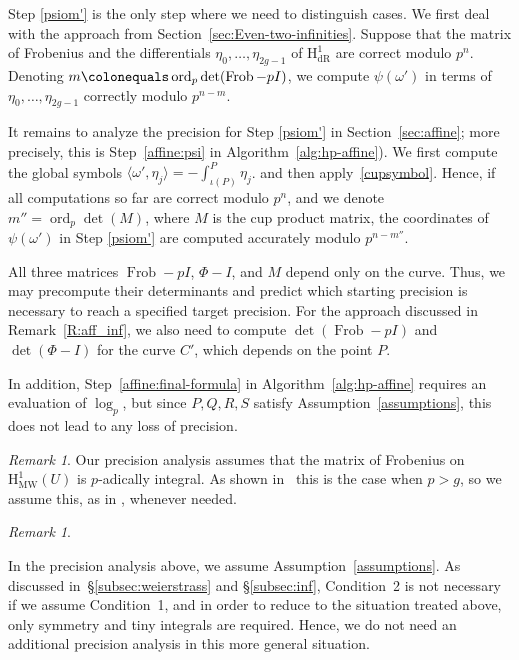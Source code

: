 \documentclass[11pt, a4paper]{amsart}
\newcommand{\hdr}{\operatorname{H^1_{dR}}}
\newcommand{\hmw}{\operatorname{H^1_{MW}}}
\newcommand{\ord}{\operatorname{ord}}
\newcommand{\Frob}{\operatorname{Frob}}
\theoremstyle{remark}
\newtheorem{remark}[theorem]{Remark}
\numberwithin{equation}{section}
\newcommand{\sg}{{}}
\begin{document}
{Step \eqref{psiom'} is the only step where we need to distinguish cases. We first deal with the approach from \sg{Section~\ref{sec:Even-two-infinities}}. Suppose that the matrix of Frobenius and the differentials $\eta_0,\ldots,\eta_{2g-1}$ of
$\hdr$ are correct modulo $p^n$. Denoting  $m\colonequals \ord_p\det(\Frob-pI)$, we compute $\psi(\omega')$ in terms of $\eta_0,\ldots,\eta_{2g-1}$ correctly modulo $p^{n-m}$.

It remains to analyze the precision for Step \eqref{psiom'} in \sg{Section~\ref{sec:affine}}; more precisely, this is Step~\eqref{affine:psi} in Algorithm~\ref{alg:hp-affine}). We first compute the global symbols $\langle
\omega',  \eta_j\rangle = -\int_{\iota(P)}^P\eta_j$.
and then apply~\eqref{cupsymbol}.
Hence, if all computations so far are correct modulo $p^n$, and we denote $m''=\ord_p\det(M)$, where $M$ is the cup product matrix, the coordinates of $\psi(\omega')$ in Step \eqref{psiom'} are computed accurately modulo $p^{n-m''}$.

All three matrices $\Frob-pI$, $\Phi-I$, and $M$ depend only on the curve. Thus, we may precompute their determinants and predict which starting
precision is necessary to reach a specified target precision.
For the approach discussed in Remark~\ref{R:aff_inf}, we also need to
compute $\det(\Frob-pI)$ and $\det(\Phi-I)$ for the curve $C'$, which depends on the point $P$.

In addition, Step~\eqref{affine:final-formula} in Algorithm~\ref{alg:hp-affine} requires an evaluation of $\log_p$, but since $P,Q,R,S$ satisfy Assumption~\ref{assumptions}, this does not lead to any loss of precision. 

\begin{remark}\label{R:pg}
Our precision analysis assumes that the matrix of Frobenius
on $\hmw(U)$ is $p$-adically integral. 
As shown in~\cite[Lemma~3.4, Conclusion]{Harrison-Even-Deg-MW} this is the
case when $p>g$, so we assume this, as
in \cite{Jen-Even-Degree-CI}, whenever needed.
\end{remark}

\begin{remark}\label{R:precspecial}

  In the precision analysis above, we assume Assumption~\ref{assumptions}. As discussed
  in~\S\ref{subsec:weierstrass} and \S\ref{subsec:inf},
  Condition~2 is not necessary if we assume Condition~1, and in order to reduce 
  to the situation treated above, only symmetry and 
tiny integrals are required.
  Hence, we do not need an additional
  precision analysis in this more general situation.
\end{remark}
}
\end{document}
